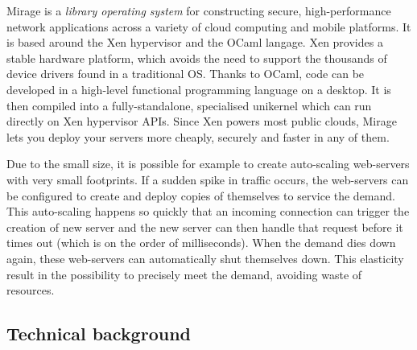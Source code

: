 \documentclass{article}
\renewcommand{\-}{\hyp}
\newcommand{\mirage}{Mirage\xspace}
\newcommand{\ocaml}{OCaml\xspace}
\newcommand{\xen}{Xen\xspace}
\begin{document}
\mirage is a \emph{library operating system} for constructing secure, high-performance network applications across a variety of cloud computing and mobile platforms.
It is based around the \xen hypervisor and the \ocaml langage. \xen provides a stable hardware platform, which avoids the need to support the thousands of device drivers found in a traditional OS.
Thanks to \ocaml, code can be developed in a high-level functional programming language on a desktop.
It is then compiled into a fully-standalone, specialised unikernel which can run directly on \xen hypervisor APIs.
Since \xen powers most public clouds, \mirage lets you deploy your servers more cheaply, securely and faster in any of them.

Due to the small size, it is possible for example to create auto-scaling web-servers with very small footprints.
If a sudden spike in traffic occurs, the web-servers can be configured to create and deploy copies of themselves to service the demand.
This auto-scaling happens so quickly that an incoming connection can trigger the creation of new server and the new server can then handle that request before it times out (which is on the order of milliseconds).
When the demand dies down again, these web-servers can automatically shut themselves down.
This elasticity result in the possibility to precisely meet the demand, avoiding waste of resources.



\subsection{Technical background}
\end{document}
